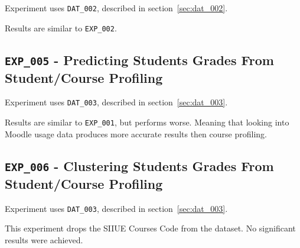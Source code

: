 Experiment uses \texttt{DAT\_002}, described in section~\ref{sec:dat_002}.

Results are similar to \texttt{EXP\_002}.

\subsection{\texttt{EXP\_005} - Predicting Students Grades From Student/Course
Profiling}

Experiment uses \texttt{DAT\_003}, described in section~\ref{sec:dat_003}.

Results are similar to \texttt{EXP\_001}, but performs worse. Meaning that
looking into Moodle usage data produces more accurate results then course
profiling.

\subsection{\texttt{EXP\_006} - Clustering Students Grades From Student/Course
Profiling}

Experiment uses \texttt{DAT\_003}, described in section~\ref{sec:dat_003}.

This experiment drops the SIIUE Courses Code from the dataset. No significant
results were achieved.
